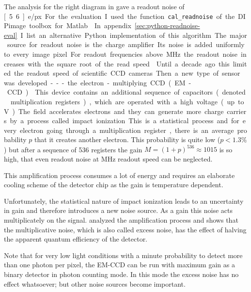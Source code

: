 The analysis for the right diagram in  gave a
readout noise of \unit[5.6]{e/px}. For the evaluation I used the
function \verb!cal_readnoise! of the DIPimage toolbox for Matlab
\citep{Lidke2005a}. In appendix \ref{sec:python-readnoise-eval} I list
an alternative Python implementation of this algorithm.

The major source for readout noise is the charge amplifier. Its noise is
added uniformly to every image pixel. For readout frequencies above
\unit[1]{MHz} the readout noise increases with the square root of the
read speed \citep{Pawley2006}. Until a decade ago this limited the
readout speed of scientific CCD cameras. Then a new type of sensor was
developed --- the electron-multiplying CCD (EM-CCD) \citep{Mackay}.

This device contains an additional sequence of capacitors (denoted        
multiplication registers), which are operated with a high voltage (up
to \unit[46]{V}). The field accelerates electrons and they can
generate more charge carriers by a process called impact
ionization. This is a statistical process and for every electron going
through a multiplication register, there is an average probability $p$
that it creates another electron. This probability is quite low
($p<1.3\%$) but after a sequence of 536 registers the gain
$M=(1+p)^{536}\approx 1015$ is so high, that even readout noise at \unit[17]{MHz}
readout speed can be neglected.

This amplification process consumes a lot of energy and requires an
elaborate cooling scheme of the detector chip as the gain is
temperature dependent.

Unfortunately, the statistical nature of impact ionization leads to an
uncertainty in gain and therefore introduces a  new noise source. As a gain this noise
acts multiplicately on the signal. \cite{Robbins2003} analyzed the
amplification process and shows that the multiplicative noise, which
is also called excess noise, has the effect of halving the apparent
quantum efficiency of the detector.

Note that for very low light conditions with a minute probability to
detect more than one photon per pixel, the EM-CCD can be run with
maximum gain as a binary detector in photon counting mode. In this
mode the excess noise has no effect whatsoever; but other noise
sources become important.

\newcommand{\SNRid}{\textrm{SNR}_{id}}
\newcommand{\SNRadd}{\textrm{SNR}_{add}}
\newcommand{\SNR}{\textrm{SNR}}
